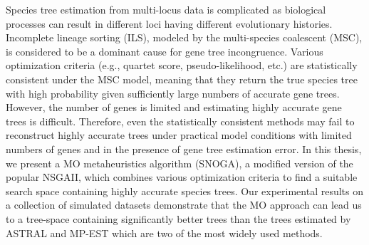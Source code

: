 Species tree estimation from multi-locus data is complicated as biological processes can result in different loci having different evolutionary histories. Incomplete lineage sorting (ILS), modeled by the multi-species coalescent (MSC), is considered to be a dominant cause for gene tree incongruence. Various optimization criteria (e.g., quartet score, pseudo-likelihood, etc.) are statistically consistent under the MSC model, meaning that they return the true species tree with high probability given sufficiently large numbers of accurate gene trees. However, the number of genes is limited and estimating highly accurate gene trees is difficult. Therefore, even the statistically consistent methods may fail to reconstruct highly accurate trees under practical model conditions with limited numbers of genes and in the presence of gene tree estimation error. In this thesis, we present a MO metaheuristics algorithm (SNOGA), a modified version of the popular NSGAII, which combines various optimization criteria to find a suitable search space containing highly accurate species trees. Our experimental results on a collection of simulated datasets demonstrate that the MO approach can lead us to a tree-space containing significantly better trees than the trees estimated by ASTRAL and MP-EST which are two of the most widely used methods. 










